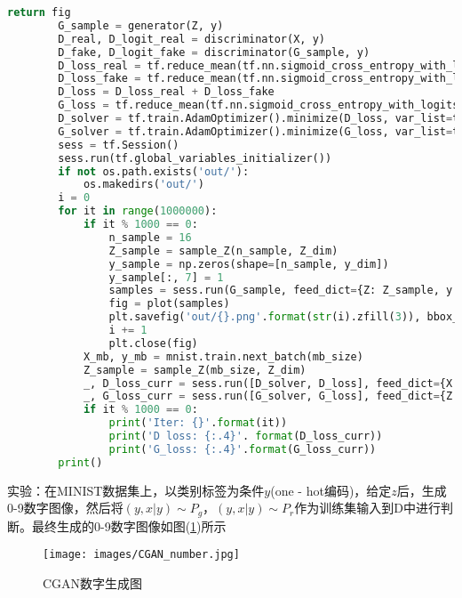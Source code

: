 \begin{lstlisting}[language = Python]
            return fig
        G_sample = generator(Z, y)
        D_real, D_logit_real = discriminator(X, y)
        D_fake, D_logit_fake = discriminator(G_sample, y)
        D_loss_real = tf.reduce_mean(tf.nn.sigmoid_cross_entropy_with_logits(logits=D_logit_real, labels=tf.ones_like(D_logit_real)))
        D_loss_fake = tf.reduce_mean(tf.nn.sigmoid_cross_entropy_with_logits(logits=D_logit_fake, labels=tf.zeros_like(D_logit_fake)))
        D_loss = D_loss_real + D_loss_fake
        G_loss = tf.reduce_mean(tf.nn.sigmoid_cross_entropy_with_logits(logits=D_logit_fake, labels=tf.ones_like(D_logit_fake)))
        D_solver = tf.train.AdamOptimizer().minimize(D_loss, var_list=theta_D)
        G_solver = tf.train.AdamOptimizer().minimize(G_loss, var_list=theta_G)
        sess = tf.Session()
        sess.run(tf.global_variables_initializer())
        if not os.path.exists('out/'):
            os.makedirs('out/')
        i = 0
        for it in range(1000000):
            if it % 1000 == 0:
                n_sample = 16
                Z_sample = sample_Z(n_sample, Z_dim)
                y_sample = np.zeros(shape=[n_sample, y_dim])
                y_sample[:, 7] = 1
                samples = sess.run(G_sample, feed_dict={Z: Z_sample, y:y_sample})
                fig = plot(samples)
                plt.savefig('out/{}.png'.format(str(i).zfill(3)), bbox_inches='tight')
                i += 1
                plt.close(fig)
            X_mb, y_mb = mnist.train.next_batch(mb_size)
            Z_sample = sample_Z(mb_size, Z_dim)
            _, D_loss_curr = sess.run([D_solver, D_loss], feed_dict={X: X_mb, Z: Z_sample, y:y_mb})
            _, G_loss_curr = sess.run([G_solver, G_loss], feed_dict={Z: Z_sample, y:y_mb})
            if it % 1000 == 0:
                print('Iter: {}'.format(it))
                print('D loss: {:.4}'. format(D_loss_curr))
                print('G_loss: {:.4}'.format(G_loss_curr))
        print()
        \end{lstlisting}
        \par
        实验：在MINIST数据集上，以类别标签为条件$y$(one - hot编码)，给定$z$后，生成0-9数字图像，然后将$(y,x|y)\sim P_g$，$(y,x|y)\sim P_r$作为训练集输入到D中进行判断。最终生成的0-9数字图像如图(\ref{fig:CGAN数字生成图})所示
                \begin{figure}[H]
                \centering
                \texttt{[image: images/CGAN\_number.jpg]}
                \caption{CGAN数字生成图}
                \label{fig:CGAN数字生成图}
                \end{figure}

